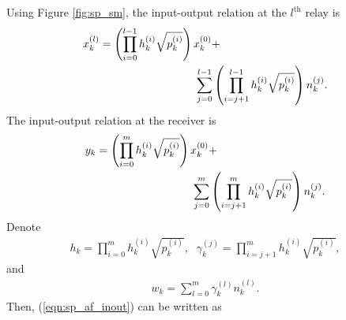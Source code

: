 \documentclass[journal]{IEEEtran}
\begin{document}
Using Figure \ref{fig:sp_sm}, the input-output relation at the $l^{\mbox{th}}$ relay is
\begin{eqnarray}
x_k^{(l)} = \left( \prod_{i=0}^{l-1} h_k^{(i)} \sqrt{p_k^{(i)}}
\right) x_k^{(0)} + \hspace{1.35in} \nonumber \\
\hspace{1.35in} \sum_{j=0}^{l-1} \left( \prod_{i=j+1}^{l-1}
h_k^{(i)} \sqrt{p_k^{(i)}} \right) n_k^{(j)} .
\label{eqn:sp_af_inout_relay_closed}
\end{eqnarray}
The input-output relation at the receiver is
\begin{eqnarray}
y_k = \left( \prod_{i=0}^m h_k^{(i)} \sqrt{p_k^{(i)}} \right)
x_k^{(0)} + \hspace{1.35in} \nonumber \\
\hspace{1.35in} \sum_{j=0}^m \left( \prod_{i=j+1}^m h_k^{(i)}
\sqrt{p_k^{(i)}} \right) n_k^{(j)}.
\label{eqn:sp_af_inout}
\end{eqnarray}
Denote
\begin{eqnarray}
h_k = \displaystyle\prod_{i=0}^m  h_k^{(i)} \sqrt{p_k^{(i)}}
\mbox{,} & \gamma_k^{(j)} = \displaystyle\prod_{i=j+1}^m h_k^{(i)}
\sqrt{p_k^{(i)}},
\label{eqn:sp_af_hk_gammak}
\end{eqnarray}
and
\begin{eqnarray}
w_k = \sum_{l=0}^{m}\gamma_k^{(l)}n_k^{(l)}.
\label{eqn:sp_af_wk}
\end{eqnarray}
Then, (\ref{eqn:sp_af_inout}) can be written as
\end{document}
